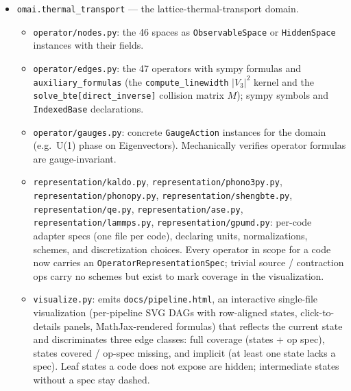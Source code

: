 \documentclass[11pt,a4paper]{article}
\begin{document}
\begin{itemize}[leftmargin=2em, itemsep=0.3em]
\begin{itemize}[leftmargin=1.2em]
            specs describe the same operator?). \texttt{compare\_representations}
            (aliased as \texttt{compare}) returns a
            \texttt{RepresentationComparisonResult} with the five-status
            verdict and residuals.
    \end{itemize}
    Code-agnostic.
  \item \texttt{omai.thermal\_transport} --- the lattice-thermal-transport domain.
    \begin{itemize}[leftmargin=1.2em]
      \item \texttt{operator/nodes.py}: the 46 spaces as \texttt{ObservableSpace} or
            \texttt{HiddenSpace} instances with their fields.
      \item \texttt{operator/edges.py}: the 47 operators with sympy formulas
            and \texttt{auxiliary\_formulas} (the \texttt{compute\_linewidth}
            $|V_3|^2$ kernel and the \texttt{solve\_bte[direct\_inverse]}
            collision matrix $M$); sympy symbols and \texttt{IndexedBase}
            declarations.
      \item \texttt{operator/gauges.py}: concrete \texttt{GaugeAction}
            instances for the domain (e.g.\ U(1) phase on Eigenvectors).
            Mechanically verifies operator formulas are gauge-invariant.
      \item \texttt{representation/kaldo.py},
            \texttt{representation/phono3py.py},
            \texttt{representation/phonopy.py},
            \texttt{representation/shengbte.py},
            \texttt{representation/qe.py},
            \texttt{representation/ase.py},
            \texttt{representation/lammps.py},
            \texttt{representation/gpumd.py}: per-code adapter specs
            (one file per code), declaring units, normalizations, schemes,
            and discretization choices. Every operator in scope for a code
            now carries an \texttt{OperatorRepresentationSpec}; trivial source /
            contraction ops carry no schemes but exist to mark coverage
            in the visualization.
      \item \texttt{visualize.py}: emits \texttt{docs/pipeline.html}, an interactive
            single-file visualization (per-pipeline SVG DAGs with row-aligned
            states, click-to-details panels, MathJax-rendered formulas) that
            reflects the current state and discriminates three edge classes:
            full coverage (states + op spec), states covered / op-spec missing,
            and implicit (at least one state lacks a spec). Leaf states a code
            does not expose are hidden; intermediate states without a spec
            stay dashed.
    \end{itemize}
\end{itemize}
\end{document}
